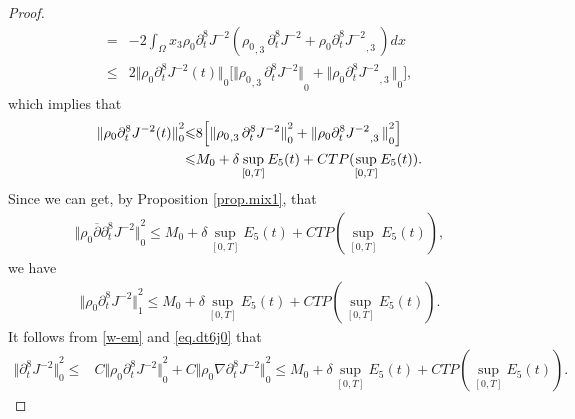 \documentclass[12pt,twoside,reqno]{amsart}
\numberwithin{equation}{section}
\theoremstyle{definition}
\theoremstyle{remark}
\begin{document}
\begin{proof}
\begin{align*}
  =&-2\int_\Omega x_3{\rho_0}  {\partial}_t^8J^{-2}({{\rho_0}_{,{3}}\,}{\partial}_t^8J^{-2} +{\rho_0} {{{{\partial}_t^8J^{-2}}}_{,{3}}\,})dx\\
  {\leqslant} &2{\Vert{{\rho_0}  {\partial}_t^8J^{-2}(t)}\Vert}_0\big[ {\Vert{{{\rho_0}_{,{3}}\,}{\partial}_t^8J^{-2}}\Vert}_0 +{\Vert{{\rho_0} {{{{\partial}_t^8J^{-2}}}_{,{3}}\,}}\Vert}_0\big],
\end{align*}
which implies that
\begin{align}\label{eq.dt6j0}
  {\Vert{{\rho_0}  {\partial}_t^8J^{-2}(t)}\Vert}_0^2{\leqslant} &8\Big[ {\Vert{{{\rho_0}_{,{3}}\,}{\partial}_t^8J^{-2}}\Vert}_0^2 +{\Vert{{\rho_0} {{{{\partial}_t^8J^{-2}}}_{,{3}}\,}}\Vert}_0^2\Big]{\nonumber}\\
  {\leqslant}& M_0+\delta \sup_{[0,T]} E_5(t)+CTP(\sup_{[0,T]}E_5(t)).
\end{align}
Since we can get, by Proposition \ref{prop.mix1}, that
\begin{align*}
  {\Vert{{\rho_0} {\overline{\partial}}{\partial}_t^8 J^{-2}}\Vert}_0^2{\leqslant} M_0+\delta \sup_{[0,T]} E_5(t)+CTP(\sup_{[0,T]}E_5(t)),
\end{align*}
we have
\begin{align*}
  {\Vert{{\rho_0}  {\partial}_t^8 J^{-2}}\Vert}_1^2{\leqslant} M_0+\delta \sup_{[0,T]} E_5(t)+CTP(\sup_{[0,T]}E_5(t)).
\end{align*}
It follows from \eqref{w-em} and \eqref{eq.dt6j0} that
\begin{align*}
  {\Vert{{\partial}_t^8 J^{-2}}\Vert}_0^2{\leqslant}& C{\Vert{{\rho_0}  {\partial}_t^8 J^{-2}}\Vert}_0^2+C{\Vert{{\rho_0} {\nabla}{\partial}_t^8 J^{-2}}\Vert}_0^2
  {\leqslant}  M_0+\delta \sup_{[0,T]} E_5(t)+CTP(\sup_{[0,T]}E_5(t)).
\end{align*}


\end{proof}
\end{document}
